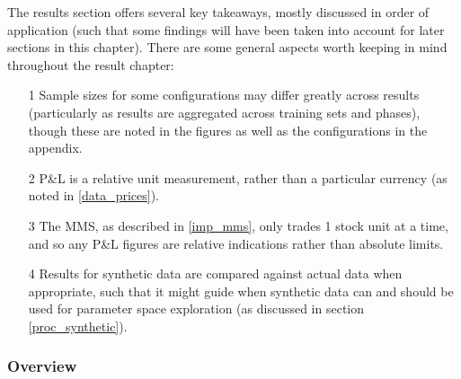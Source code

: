 \documentclass[a4paper,11pt,oneside]{article}
\theoremstyle{plain}
\theoremstyle{definition}
\begin{document}
	The results section offers several key takeaways, mostly discussed in order of application (such that some findings will have been taken into account for later sections in this chapter). There are some general aspects worth keeping in mind throughout the result chapter:
	\begin{itemize}
		\item[1] Sample sizes for some configurations may differ greatly across results (particularly as results are aggregated across training sets and phases), though these are noted in the figures as well as the configurations in the appendix.
		\item[2] P\&L is a relative unit measurement, rather than a particular currency (as noted in \ref{data_prices}).
		\item[3] The MMS, as described in \ref{imp_mms}, only trades 1 stock unit at a time, and so any P\&L figures are relative indications rather than absolute limits.
		\item[4]  Results for synthetic data are compared against actual data when appropriate, such that it might guide when synthetic data can and should be used for parameter space exploration (as discussed in section \ref{proc_synthetic}).
	\end{itemize}
	
	\subsubsection{Overview}
	
\end{document}
